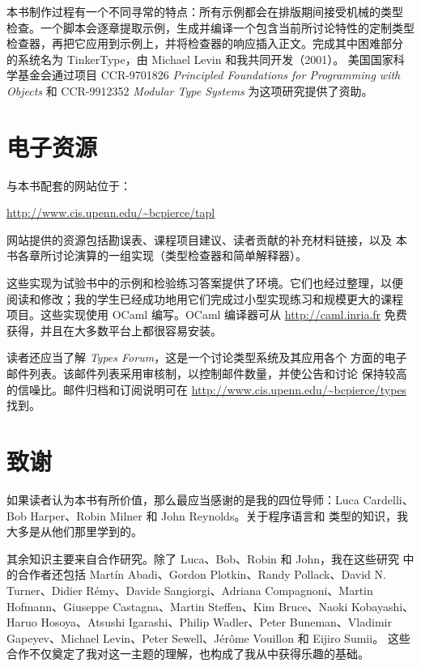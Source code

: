 本书制作过程有一个不同寻常的特点：所有示例都会在排版期间接受机械的类型
检查。一个脚本会逐章提取示例，生成并编译一个包含当前所讨论特性的定制类型
检查器，再把它应用到示例上，并将检查器的响应插入正文。完成其中困难部分
的系统名为 \textsf{TinkerType}，由 Michael Levin 和我共同开发（2001）。
美国国家科学基金会通过项目 CCR-9701826
\emph{Principled Foundations for Programming with Objects} 和
CCR-9912352 \emph{Modular Type Systems} 为这项研究提供了资助。

\section*{电子资源}

与本书配套的网站位于：

\begin{center}
  \url{http://www.cis.upenn.edu/~bcpierce/tapl}
\end{center}

网站提供的资源包括勘误表、课程项目建议、读者贡献的补充材料链接，以及
本书各章所讨论演算的一组实现（类型检查器和简单解释器）。

这些实现为试验书中的示例和检验练习答案提供了环境。它们也经过整理，以便
阅读和修改；我的学生已经成功地用它们完成过小型实现练习和规模更大的课程
项目。这些实现使用 OCaml 编写。OCaml 编译器可从
\url{http://caml.inria.fr} 免费获得，并且在大多数平台上都很容易安装。

读者还应当了解 \emph{Types Forum}，这是一个讨论类型系统及其应用各个
方面的电子邮件列表。该邮件列表采用审核制，以控制邮件数量，并使公告和讨论
保持较高的信噪比。邮件归档和订阅说明可在
\url{http://www.cis.upenn.edu/~bcpierce/types} 找到。

\section*{致谢}

如果读者认为本书有所价值，那么最应当感谢的是我的四位导师：Luca
Cardelli、Bob Harper、Robin Milner 和 John Reynolds。关于程序语言和
类型的知识，我大多是从他们那里学到的。

其余知识主要来自合作研究。除了 Luca、Bob、Robin 和 John，我在这些研究
中的合作者还包括 Martín Abadi、Gordon Plotkin、Randy Pollack、David N.
Turner、Didier Rémy、Davide Sangiorgi、Adriana Compagnoni、Martin
Hofmann、Giuseppe Castagna、Martin Steffen、Kim Bruce、Naoki Kobayashi、
Haruo Hosoya、Atsushi Igarashi、Philip Wadler、Peter Buneman、Vladimir
Gapeyev、Michael Levin、Peter Sewell、Jérôme Vouillon 和 Eijiro Sumii。
这些合作不仅奠定了我对这一主题的理解，也构成了我从中获得乐趣的基础。

